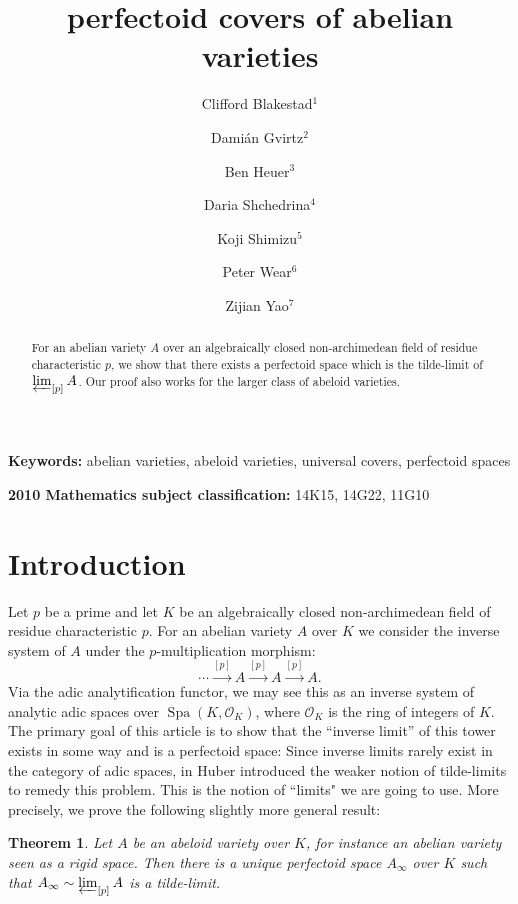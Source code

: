\documentclass[10pt,oneside]{amsart}
\title[perfectoid covers of abelian varieties]{perfectoid  covers of abelian varieties}
\author{
	Clifford Blakestad$^1$\and
	Dami\'an Gvirtz$^2$\and
	Ben Heuer$^3$ \and 
	Daria Shchedrina$^4$ \and
	Koji Shimizu$^5$ \and 
	Peter Wear$^6$ \and
	Zijian Yao$^7$}
\newtheorem{mainthm}{Theorem}
\theoremstyle{definition}
\begin{document}
	\maketitle
	\begin{abstract}
For an abelian variety $A$ over an algebraically closed non-archimedean field of residue characteristic $p$, we show that there exists a perfectoid space which is the tilde-limit of $\varprojlim_{[p]}A$. Our proof also works for the larger class of abeloid varieties.
	\end{abstract}
	\smallskip
	\noindent \textbf{Keywords:} abelian varieties, abeloid varieties, universal covers, perfectoid spaces
	
	\smallskip
	\noindent \textbf{2010 Mathematics subject classification:} 14K15, 14G22, 11G10

	

	
	\section{Introduction} 

Let $p$ be a prime and let $K$ be an algebraically closed non-archimedean field of residue characteristic $p$.
For an abelian variety $A$ over $K$ we consider the inverse system of $A$ under the $p$-multiplication morphism:
\[\cdots\xrightarrow{[p]}A\xrightarrow{[p]}A\xrightarrow{[p]}A.\]
Via the adic analytification functor, we may see this as an inverse system of analytic adic spaces over $\operatorname{Spa}(K,\mathcal O_K)$, where $\mathcal O_K$ is the ring of integers of $K$.
The primary goal of this article is to show that the ``inverse limit'' of this tower exists in some way and is a perfectoid space: Since inverse limits rarely exist in the category of adic spaces, in \cite{huber2013etale} Huber introduced the weaker notion of tilde-limits to remedy this problem. This is the notion of ``limits" we are going to use. More precisely, we prove the following slightly more general result:

 


\begin{mainthm} \label{thm:main_thm_intro}
	Let $A$ be an abeloid variety over $K$, for instance an abelian variety seen as a rigid space. Then there is a unique perfectoid space $A_\infty$ over $K$ such that
	$A_\infty \sim \varprojlim_{[p]} A$ is a tilde-limit.
\end{mainthm}
\end{document}
